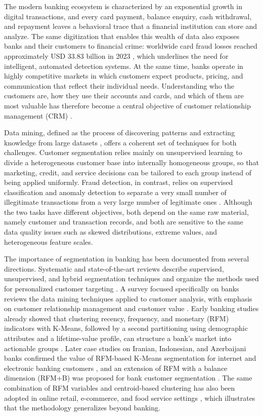 \documentclass[conference]{IEEEtran}
\begin{document}
The modern banking ecosystem is characterized by an exponential growth in digital transactions, and every card payment, balance enquiry, cash withdrawal, and repayment leaves a behavioral trace that a financial institution can store and analyze. The same digitization that enables this wealth of data also exposes banks and their customers to financial crime: worldwide card fraud losses reached approximately USD 33.83 billion in 2023 \cite{nilson2023}, which underlines the need for intelligent, automated detection systems. At the same time, banks operate in highly competitive markets in which customers expect products, pricing, and communication that reflect their individual needs. Understanding who the customers are, how they use their accounts and cards, and which of them are most valuable has therefore become a central objective of customer relationship management (CRM) \cite{ngai2011application}.

Data mining, defined as the process of discovering patterns and extracting knowledge from large datasets \cite{han2011data}, offers a coherent set of techniques for both challenges. Customer segmentation relies mainly on unsupervised learning to divide a heterogeneous customer base into internally homogeneous groups, so that marketing, credit, and service decisions can be tailored to each group instead of being applied uniformly. Fraud detection, in contrast, relies on supervised classification and anomaly detection to separate a very small number of illegitimate transactions from a very large number of legitimate ones \cite{bolton2002statistical}. Although the two tasks have different objectives, both depend on the same raw material, namely customer and transaction records, and both are sensitive to the same data quality issues such as skewed distributions, extreme values, and heterogeneous feature scales.

The importance of segmentation in banking has been documented from several directions. Systematic and state-of-the-art reviews describe supervised, unsupervised, and hybrid segmentation techniques and organize the methods used for personalized customer targeting \cite{das2022,gomes2023}. A survey focused specifically on banks reviews the data mining techniques applied to customer analysis, with emphasis on customer relationship management and customer value \cite{hasheminejad2018}. Early banking studies already showed that clustering recency, frequency, and monetary (RFM) indicators with K-Means, followed by a second partitioning using demographic attributes and a lifetime-value profile, can structure a bank's market into actionable groups \cite{kumar2012}. Later case studies on Iranian, Indonesian, and Azerbaijani banks confirmed the value of RFM-based K-Means segmentation for internet and electronic banking customers \cite{fouladifar2016,aryuni2018,aliyev2020}, and an extension of RFM with a balance dimension (RFM+B) was proposed for bank customer segmentation \cite{firdaus2021}. The same combination of RFM variables and centroid-based clustering has also been adopted in online retail, e-commerce, and food service settings \cite{singh2023,kc2026,hasugian2026}, which illustrates that the methodology generalizes beyond banking.
\end{document}
